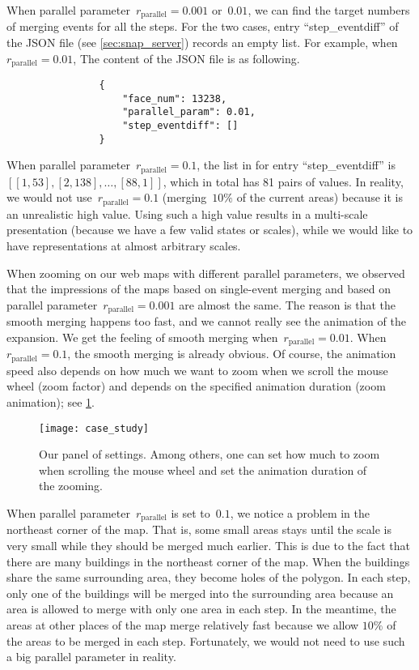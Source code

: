 \documentclass[ijgi,article,submit,moreauthors,pdftex]{Definitions/mdpi}
\begin{document}
When parallel parameter~$r_\mathrm{parallel}= 0.001$ or~$0.01$,
we can find the target numbers of merging events for all the steps.
For the two cases, entry ``step\_eventdiff'' of the JSON file
(see \sect\ref{sec:snap_server})
records an empty list.
For example, when~$r_\mathrm{parallel}= 0.01$,
The content of the JSON file is as following.
\begin{verbatim}
                {
                    "face_num": 13238,
                    "parallel_param": 0.01,                    
                    "step_eventdiff": []
                }
\end{verbatim}
When parallel parameter~$r_\mathrm{parallel}= 0.1$,
the list in for entry ``step\_eventdiff'' is  
$[[1, 53], [2, 138], \dots, [88, 1]]$,
which in total has 81 pairs of values.
In reality, we would not use~$r_\mathrm{parallel}= 0.1$
(merging~$10\%$ of the current areas)
because it is an unrealistic high value.
Using such a high value results in a multi-scale presentation
(because we have a few valid states or scales),
while we would like to have representations at almost
arbitrary scales.


When zooming on our web maps with different parallel parameters,
we observed that the impressions of the maps 
based on single-event merging and based on parallel parameter~$r_\mathrm{parallel}= 0.001$ 
are almost the same.
The reason is that the smooth merging happens too fast,
and we cannot really see the animation of the expansion.
We get the feeling of smooth merging when~$r_\mathrm{parallel}= 0.01$.
When~$r_\mathrm{parallel}= 0.1$, the smooth merging is already obvious.
Of course, the animation speed also depends on how much we want to zoom
when we scroll the mouse wheel (zoom factor) 
and depends on the specified animation duration (zoom animation);
see \fig\ref{fig:interaction_settings}.


\begin{figure}[tb]
\centering
\texttt{[image: case\_study]}
\caption{Our panel of settings. 
Among others, one can set how much to zoom when scrolling the mouse wheel 
and set the animation duration of the zooming.}
\label{fig:interaction_settings}
\end{figure}

When parallel parameter~$r_\mathrm{parallel}$ is set to~$0.1$,
we notice a problem in the northeast corner of the map.
That is, some small areas stays until the scale is very small
while they should be merged much earlier.
This is due to the fact that 
there are many buildings in the northeast corner of the map.
When the buildings share the same surrounding area,
they become holes of the polygon.
In each step, only one of the buildings will be merged into the surrounding area
because an area is allowed to merge with only one area in each step.
In the meantime, the areas at other places of the map merge relatively fast
because we allow $10\%$ of the areas to be merged in each step.
Fortunately, we would not need to use such a big parallel parameter in reality.
\end{document}

